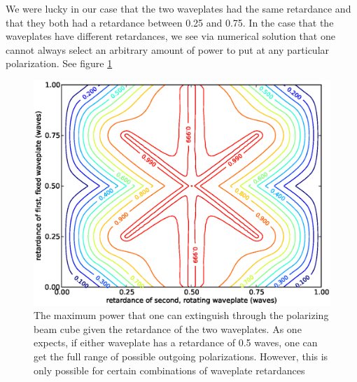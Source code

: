 We were lucky in our case that the two waveplates had the same retardance and that they both had a retardance between 0.25 and 0.75. In the case that the waveplates have different retardances, we see via numerical solution that one cannot always select an arbitrary amount of power to put at any particular polarization. See figure \ref{asymmetric}

\begin{figure}
    \centerline{\includegraphics{NewNotesAsymmetricFigure}}
    \caption[Numerical method]{\label{asymmetric}
   The maximum power that one can extinguish through the polarizing beam cube given the retardance of the two waveplates. As one expects, if either waveplate has a retardance of 0.5 waves, one can get the full range of possible outgoing polarizations. However, this is only possible for certain combinations of waveplate retardances}
\end{figure}


